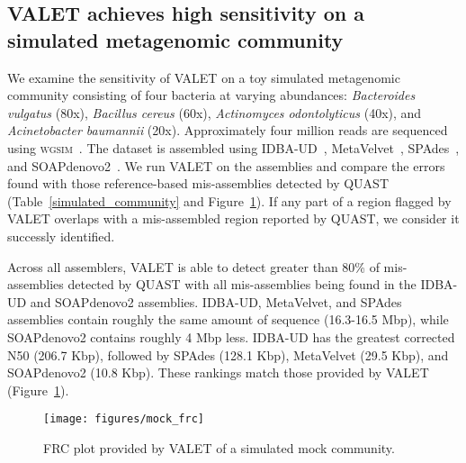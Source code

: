 \subsection{VALET achieves high sensitivity on a simulated metagenomic community}

We examine the sensitivity of VALET on a toy simulated metagenomic community consisting of four bacteria at varying abundances: \emph{Bacteroides vulgatus} (80x), \emph{Bacillus cereus} (60x), \emph{Actinomyces odontolyticus} (40x), and \emph{Acinetobacter baumannii} (20x).
Approximately four million reads are sequenced using \textsc{wgsim}~\cite{li2013wgsim}.
The dataset is assembled using IDBA-UD~\cite{peng2012idba}, MetaVelvet~\cite{namiki2012metavelvet}, SPAdes~\cite{bankevich2012spades}, and SOAPdenovo2~\cite{luo2012soapdenovo2}.
We run VALET on the assemblies and compare the errors found with those reference-based mis-assemblies detected by QUAST (Table~\ref{simulated_community} and Figure~\ref{fig:mock_frc}).
If any part of a region flagged by VALET overlaps with a mis-assembled region reported by QUAST, we consider it successly identified.

Across all assemblers, VALET is able to detect greater than 80\% of mis-assemblies detected by QUAST with all mis-assemblies being found in the IDBA-UD and SOAPdenovo2 assemblies.
IDBA-UD, MetaVelvet, and SPAdes assemblies contain roughly the same amount of sequence (16.3-16.5 Mbp), while SOAPdenovo2 contains roughly 4 Mbp less.
IDBA-UD has the greatest corrected N50 (206.7 Kbp), followed by SPAdes (128.1 Kbp), MetaVelvet (29.5 Kbp), and SOAPdenovo2 (10.8 Kbp).
These rankings match those provided by VALET (Figure~\ref{fig:mock_frc}).



\begin{figure}[tb!]
\begin{center}
\texttt{[image: figures/mock\_frc]}
\end{center}
\renewcommand{\baselinestretch}{1}
\small\normalsize
\begin{quote}
\caption[RC plot of a simulated mock community]{FRC plot provided by VALET of a simulated mock community.}
\label{fig:mock_frc}
\end{quote}
\end{figure}
\renewcommand{\baselinestretch}{2}
\small\normalsize


